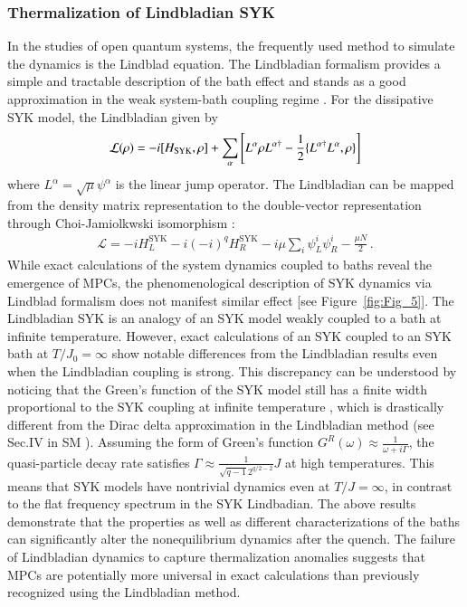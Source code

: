 \documentclass[prl,superscriptaddress,notitlepage,showpacs,twocolumn]{revtex4-2}
\newcommand{\om}{{\omega}}
\begin{document}
\subsubsection{Thermalization of Lindbladian SYK}
In the studies of open quantum systems, the frequently used method to simulate the dynamics is the Lindblad equation. The Lindbladian formalism provides a simple and tractable description of the bath effect and stands as a good approximation in the weak system-bath coupling regime \cite{breuer2002theory}. For the dissipative SYK model, the Lindbladian given by 
\begin{align}
  \mathcal{L}
  (\rho) = - i [H_{{\rm SYK}}, \rho]  +  \sum_{\alpha} \left[L^{\alpha}\rho L^{\alpha\dag}- \frac{1}{2} \{ L^{\alpha\dag} L^{\alpha}, \rho \} \right]
\end{align}
where $L^\alpha=\sqrt{\mu} \psi^\alpha$ is the linear jump operator. The Lindbladian can be mapped from the density matrix representation to the double-vector representation through Choi-Jamiolkwski isomorphism \cite{sa2022lindbladian,kulkarni2022lindbladian}:
\begin{align}
  \mathcal{L}= -i H_L^{\mathrm{SYK}}-i (-i)^q H_R^{\mathrm{SYK}}-i\mu \sum_i \psi_L^i \psi_R^i -\frac{\mu N}{2}\,.
\end{align}
While exact calculations of the system dynamics coupled to baths reveal the emergence of MPCs, the phenomenological description of SYK dynamics via Lindblad formalism does not manifest similar effect [see Figure~\ref{fig:Fig_5}]. The Lindbladian SYK is an analogy of an SYK model weakly coupled to a bath at infinite temperature. However, exact calculations of an SYK coupled to an SYK bath at $T/J_0=\infty$ show notable differences from the Lindbladian results even when the Lindbladian coupling is strong. This discrepancy can be understood by noticing that the Green's function of the SYK model still has a finite width proportional to the SYK coupling at infinite temperature \cite{zhang2021obstacle}, which is drastically different from the Dirac delta approximation in the Lindbladian method (see Sec.IV in SM \cite{suppl}). Assuming the form of Green's function $G^R(\omega)\approx \frac{1}{\om+i\Gamma}$, the quasi-particle decay rate satisfies $\Gamma \approx \frac{1}{\sqrt{q-1}2^{q/2-2}}J$ at high temperatures. This means that SYK models have nontrivial dynamics even at $T/J=\infty$, in contrast to the flat frequency spectrum in the SYK Lindbadian. The above results demonstrate that the properties as well as different characterizations of the baths can significantly alter the nonequilibrium dynamics after the quench. The failure of Lindbladian dynamics to capture thermalization anomalies suggests that MPCs are potentially more universal in exact calculations than previously recognized using the Lindbladian method.
\end{document}
